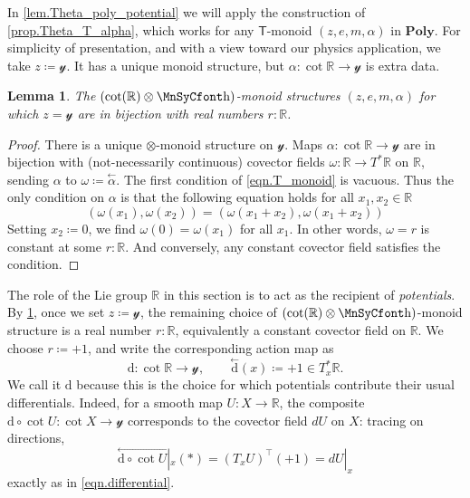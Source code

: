 \documentclass[11pt, oneside, article]{memoir}
\theoremstyle{definition}
\theoremstyle{plain}
\newtheorem{lemma}[lemma]{Lemma}
\newcommand{\Cat}[1]{\mathbf{#1}}%
\newcommand{\fun}[1]{\mathrm{#1}}%
\newcommand{\Fun}[1]{\mathsf{#1}}%
\newcommand{\bk}[1]{\overset{\scriptscriptstyle\leftarrow}{#1}}
\newcommand{\rr}{\mathbb{R}}
\newcommand{\yon}{\mathcal{y}}
\newcommand{\poly}{\Cat{Poly}}
\newcommand{\potd}{\fun{d}}
\newcommand{\smallsquare}{\mbox{\MnSyCfont\symbol{"68}}}
\newcommand{\blank}{\mathord{\smallsquare}}
\begin{document}
In \cref{lem.Theta_poly_potential} we will apply the construction of \cref{prop.Theta_T_alpha}, which works for any $\Fun T$-monoid $(z,e,m,\alpha)$ in $\poly$. For simplicity of presentation, and with a view toward our physics application, we take $z\coloneqq\yon$. It has a unique monoid structure, but $\alpha\colon\cot{\rr}\to\yon$ is extra data.

\begin{lemma}\label{lem.alpha_constant}
The $(\cot{\rr}\otimes\blank)$-monoid structures $(z,e,m,\alpha)$ for which $z=\yon$ are in bijection with real numbers $r:\rr$.
\end{lemma}

\begin{proof}
There is a unique $\otimes$-monoid structure on $\yon$. Maps $\alpha\colon\cot{\rr}\to\yon$ are in bijection with (not-necessarily continuous) covector fields $\omega\colon\rr\to T^*\rr$ on $\rr$, sending $\alpha$ to $\omega\coloneqq\bk{\alpha}$. The first condition of \eqref{eqn.T_monoid} is vacuous. Thus the only condition on $\alpha$ is that the following equation holds for all $x_1,x_2\in\rr$
\[
\left(\omega(x_1),\omega(x_2)\right)=
\left(\omega(x_1+x_2),\omega(x_1+x_2)\right)
\]
Setting $x_2\coloneqq 0$, we find $\omega(0)=\omega(x_1)$ for all $x_1$. In other words, $\omega=r$ is constant at some $r:\rr$. And conversely, any constant covector field satisfies the condition.
 \end{proof}

The role of the Lie group $\rr$ in this section is to act as the recipient of \emph{potentials}. By \cref{lem.alpha_constant}, once we set $z\coloneqq\yon$, the remaining choice of $(\cot{\rr}\otimes\blank)$-monoid structure is a real number $r:\rr$, equivalently a constant covector field on $\rr$. We choose $r\coloneqq+1$, and write the corresponding action map as
\begin{equation}\label{eqn.d_potential}
\potd\colon\cot{\rr}\to\yon,\qquad\bk{\potd}(x)\coloneqq +1\in T^*_x\rr.
\end{equation}
We call it $\potd$ because this is the choice for which potentials contribute their usual differentials. Indeed, for a smooth map $U\colon X\to\rr$, the composite $\potd\circ\cot{U}\colon\cot{X}\to\yon$ corresponds to the covector field $dU$ on $X$: tracing on directions,
\[
\bk{\potd\circ\cot{U}}|_x(*)=(T_x U)^\top(+1)=dU|_x
\]
exactly as in \eqref{eqn.differential}.
\end{document}
